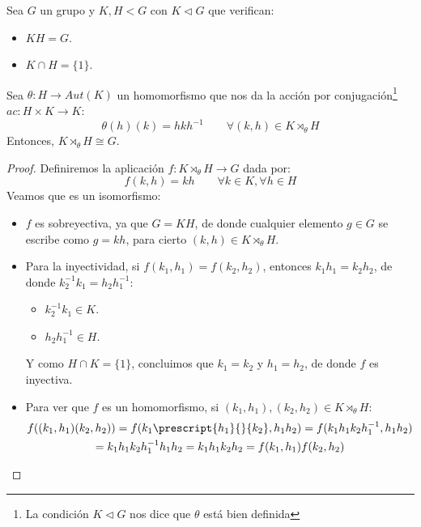 \begin{teo}
    Sea $G$ un grupo y $K,H<G$ con $K\lhd G$ que verifican:
    \begin{itemize}
        \item $KH = G$.
        \item $K\cap H = \{1\}$.
    \end{itemize}
    Sea $\theta:H\to Aut(K)$ un homomorfismo que nos da la acción por conjugación\footnote{La condición $K\lhd G$ nos dice que $\theta$ está bien definida} $ac:H\times K\to K$:
    \begin{equation*}
        \theta(h)(k) = hkh^{-1} \qquad \forall (k,h)\in K\rtimes_\theta H
    \end{equation*}
    Entonces, $K\rtimes_\theta H \cong G$.
    \begin{proof}
        Definiremos la aplicación $f:K\rtimes_\theta H \to G$ dada por:
        \begin{equation*}
            f(k,h) = kh \qquad \forall k\in K, \forall h\in H
        \end{equation*}
        Veamos que es un isomorfismo:
        \begin{itemize}
            \item $f$ es sobreyectiva, ya que $G = KH$, de donde cualquier elemento $g\in G$ se escribe como $g = kh$, para cierto $(k,h)\in K\rtimes_\theta H$.
            \item Para la inyectividad, si $f(k_1,h_1) = f(k_2,h_2)$, entonces $k_1h_1 = k_2h_2$, de donde $k_2^{-1}k_1=h_2h_1^{-1}$:
                \begin{itemize}
                    \item $k_2^{-1}k_1\in K$.
                    \item $h_2h_1^{-1}\in H$.
                \end{itemize}
                Y como $H\cap K = \{1\}$, concluimos que $k_1 = k_2$ y $h_1 = h_2$, de donde $f$ es inyectiva.
            \item Para ver que $f$ es un homomorfismo, si $(k_1,h_1),(k_2,h_2)\in K\rtimes_\theta H$:
                \begin{multline*}
                    f((k_1,h_1)(k_2,h_2)) = f(k_1\prescript{h_1}{}{k_2},h_1h_2) = f(k_1h_1k_2h_1^{-1},h_1h_2) \\ = k_1h_1k_2h_1^{-1}h_1h_2 = k_1h_1k_2h_2 = f(k_1,h_1)f(k_2,h_2)
                \end{multline*}
        \end{itemize}
    \end{proof}
\end{teo}

